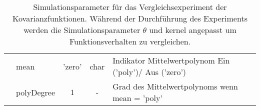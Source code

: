 \begin{table}[!htbp]
{\begin{tabular}{l l c c l}
			                                         & mean                & 'zero'                               & char                            & Indikator Mittelwertpolynom Ein ('poly')/ Aus ('zero')              \\
			                                         & polyDegree          & $1$                                  & -                               & Grad des Mittelwertpolynoms wenn mean = 'poly'                      \\ \bottomrule
		\end{tabular}}
	\caption[Simulationsparameter für das Vergleichsexperiment der Kovarianzfunktionen]{Simulationsparameter für das Vergleichsexperiment der Kovarianzfunktionen. Während der Durchführung des Experiments werden die Simulationsparameter $\theta$ und kernel angepasst um Funktionsverhalten zu vergleichen.}
	\label{tab:sim-params-exp-kfun}
\end{table}
